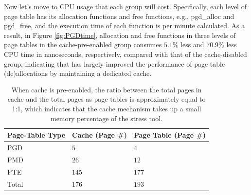 Now let’s move to CPU usage that each group will cost. Specifically, each level of page table has its allocation functions and free functions, e.g., pgd\_alloc and pgd\_free, and the execution time of each function is per minute calculated. As a result, in Figure \ref{fig:PGDtime}, allocation and free functions in three levels of page tables in the cache-pre-enabled group consumes $5.1$\% less and $70.9$\% less CPU time in nanoseconds, respectively, compared with that of the cache-disabled group, indicating that \name has largely improved the performance of page table (de)allocations by maintaining a dedicated cache.

\begin{table}[!ht]
\footnotesize
\begin{center}
\begin{tabular}{|l|l|l|}
\hline
{\textbf{Page-Table Type}} & {\textbf{Cache (Page \#)}} & {\textbf{Page Table (Page \#)}} \\ \hline
PGD & $5$  & $4$ \\ \hline
PMD & $26$ & $12$ \\ \hline
PTE & $145$ & $177$ \\ \hline
Total & $176$ & $193$ \\ \hline
\end{tabular}
\end{center}
\caption{When cache is pre-enabled, the ratio between the total pages in cache and the total pages as page tables is approximately equal to 1:1, which indicates that the cache mechanism takes up a small memory percentage of the stress tool.}
\label{tab:prePGpool}
\end{table}

